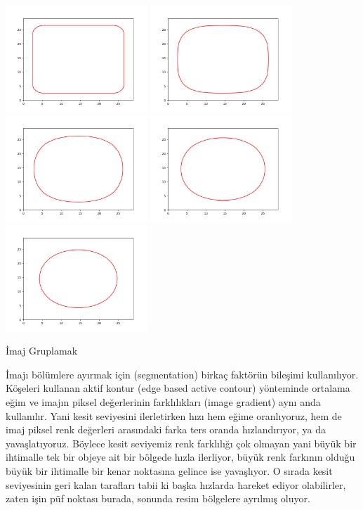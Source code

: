 \documentclass[12pt,fleqn]{article}\usepackage{../../common}
\begin{document}
\includegraphics[height=4cm]{level_1_0.png}
\includegraphics[height=4cm]{level_1_10.png}
\includegraphics[height=4cm]{level_1_20.png}
\includegraphics[height=4cm]{level_1_30.png}
\includegraphics[height=4cm]{level_1_40.png}

İmaj Gruplamak

İmajı bölümlere ayırmak için (segmentation) birkaç faktörün bileşimi
kullanılıyor. Köşeleri kullanan aktif kontur (edge based active contour)
yönteminde ortalama eğim ve imajın piksel değerlerinin farklılıkları (image
gradient) aynı anda kullanılır. Yani kesit seviyesini ilerletirken hızı hem
eğime oranlıyoruz, hem de imaj piksel renk değerleri arasındaki farka ters
oranda hızlandırıyor, ya da yavaşlatıyoruz. Böylece kesit seviyemiz renk
farklılığı çok olmayan yani büyük bir ihtimalle tek bir objeye ait bir
bölgede hızla ilerliyor, büyük renk farkının olduğu büyük bir ihtimalle bir
kenar noktasına gelince ise yavaşlıyor. O sırada kesit seviyesinin geri
kalan tarafları tabii ki başka hızlarda hareket ediyor olabilirler, zaten
işin püf noktası burada, sonunda resim bölgelere ayrılmış oluyor.
\end{document}
